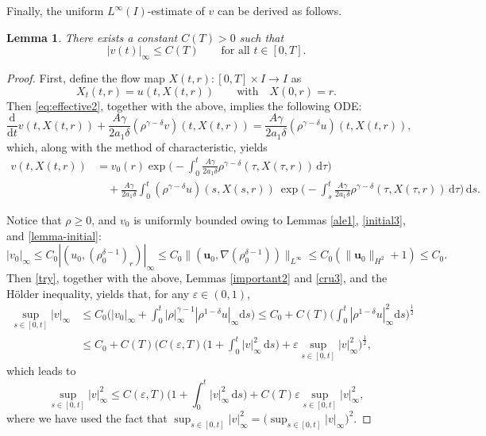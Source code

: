 \documentclass[11pt,reqno]{amsart}
\newtheorem{lem}{Lemma}[section]
\numberwithin{rk}{section}
\numberwithin{prop}{section}
\numberwithin{mydef}{section}
\numberwithin{lem}{section}
\numberwithin{equation}{section}
\numberwithin{thm}{section}
\begin{document}
Finally, the uniform $L^\infty(I)$-estimate of $v$ can be derived as follows.
\begin{lem}\label{l4.4}
There exists a constant $C(T)>0$ such that
\begin{equation*}
|v(t)|_\infty\leq C(T) \qquad \text{for all $t\in [0,T]$}.
\end{equation*}
\end{lem}
\begin{proof} 
First, define the flow map $X(t,r): [0,T]\times I \to I$ as 
\begin{equation*}
X_t(t,r)=u(t,X(t,r))\qquad\text{with} \quad X(0,r)=r.
\end{equation*}
Then \eqref{eq:effective2}, together with the above, implies the following ODE:
\begin{equation*}
\frac{\mathrm{d}}{\mathrm{d}t}v(t,X(t,r))+\frac{A\gamma}{2a_1\delta}(\rho^{\gamma-\delta}v)(t,X(t,r))=\frac{A\gamma}{2a_1\delta}(\rho^{\gamma-\delta}u)(t,X(t,r)),
\end{equation*}
which, along with the method of characteristic, yields
\begin{equation}\label{try}
\begin{aligned}
v(t,X(t,r))&=v_0(r)\exp\Big(-\int_0^t \frac{A\gamma}{2a_1\delta} \rho^{\gamma-\delta}(\tau,X(\tau,r))\,\mathrm{d}\tau\Big)\\
&\quad +\frac{A\gamma}{2a_1\delta}\int_0^t (\rho^{\gamma-\delta}u)(s,X(s,r))\ \exp\Big(\!-\!\int_s^t \frac{A\gamma}{2a_1\delta} \rho^{\gamma-\delta}(\tau,X(\tau,r))\,\mathrm{d}\tau\Big)\,\mathrm{d}s.
\end{aligned}
\end{equation}

Notice that $\rho\geq 0$, and  $v_0$ is uniformly bounded owing to Lemmas \ref{ale1}, \ref{initial3}, and \ref{lemma-initial}:
\begin{equation*}
|v_0|_\infty\leq C_0|(u_0,(\rho_0^{\delta-1})_r)|_\infty \leq C_0\|(\boldsymbol{u}_0,\nabla(\rho_0^{\delta-1}))\|_{L^\infty}\leq C_0(\|\boldsymbol{u}_0\|_{H^2}+1)\leq C_0.
\end{equation*}
Then \eqref{try}, together with the above, Lemmas \ref{important2} and \ref{cru3}, and the H\"older inequality, yields that, for any $\varepsilon\in (0,1)$,
\begin{equation*} 
\begin{aligned}
\sup_{s\in[0,t]}|v|_\infty&\leq  C_0\Big(|v_0|_\infty+\int_0^t|\rho|_\infty^{\gamma-1}|\rho^{1-\delta}u|_\infty\mathrm{d}s\Big) \leq  C_0+C(T)\Big(\int_0^t |\rho^{1-\delta}u|_\infty^2\mathrm{d}s\Big)^\frac{1}{2}\\
&\leq C_0+C(T)\Big(C(\varepsilon,T)\Big(1+\int_0^t |v|_\infty^2\,\mathrm{d}s\Big)+ \varepsilon\sup_{s\in[0,t]}|v|_\infty^2\Big)^\frac{1}{2},
\end{aligned}
\end{equation*}
which leads to
\begin{equation}\label{e-1.17} 
\sup_{s\in[0,t]}|v|_\infty^2 \leq  C(\varepsilon,T)\big(1+\int_0^t |v|_\infty^2\,\mathrm{d}s\big)+ C(T)\varepsilon\sup_{s\in[0,t]}|v|_\infty^2, 
\end{equation}
where we have used the fact that $\sup_{s\in[0,t]}|v|_\infty^2=\big(\sup_{s\in[0,t]}|v|_\infty\big)^2$. 


\end{proof}
\end{document}
